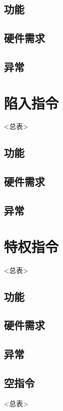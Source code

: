     \subsection{功能}
    \subsection{硬件需求}
    \subsection{异常}

\section{陷入指令}
<总表>
    \subsection{功能}
    \subsection{硬件需求}
    \subsection{异常}

\section{特权指令}
<总表>
    \subsection{功能}
    \subsection{硬件需求}
    \subsection{异常}

\subsection{空指令}
<总表>
